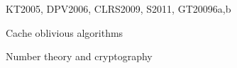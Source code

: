 \begin{syllabus}
\begin{unit}{\ALFundamentalDataStructuresandAlgorithms}{}{KT2005, DPV2006, CLRS2009, S2011, GT2009}{6}{a,b}
\begin{topics}%
    \item \ALFundamentalDataStructuresandAlgorithmsTopicGraphsAnd %
    \item Cache oblivious algorithms 
    \item Number theory and cryptography
\end{topics}
\begin{learningoutcomes}
    \item \ALFundamentalDataStructuresandAlgorithmsLODiscussFactors [\Familiarity] %
    \item \ALFundamentalDataStructuresandAlgorithmsLOSolveProblems [\Assessment] %
    \item \ALFundamentalDataStructuresandAlgorithmsLODemonstrate [\Assessment] %
    \item \ALFundamentalDataStructuresandAlgorithmsLOSolveProblemsAlgorithms [\Assessment] %
\end{learningoutcomes}
\end{unit}


\end{syllabus}
